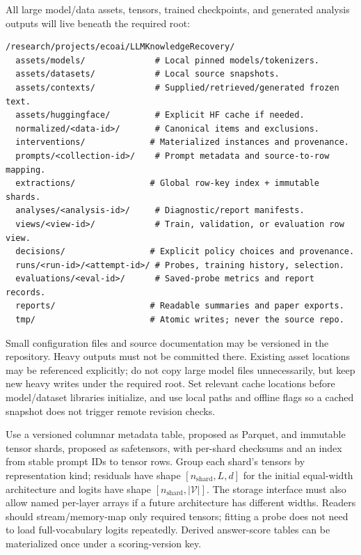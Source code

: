 \documentclass[11pt]{article}
\begin{document}
All large model/data assets, tensors, trained checkpoints, and generated analysis outputs will live beneath the required root:
\begin{verbatim}
/research/projects/ecoai/LLMKnowledgeRecovery/
  assets/models/              # Local pinned models/tokenizers.
  assets/datasets/            # Local source snapshots.
  assets/contexts/            # Supplied/retrieved/generated frozen text.
  assets/huggingface/         # Explicit HF cache if needed.
  normalized/<data-id>/       # Canonical items and exclusions.
  interventions/             # Materialized instances and provenance.
  prompts/<collection-id>/    # Prompt metadata and source-to-row mapping.
  extractions/               # Global row-key index + immutable shards.
  analyses/<analysis-id>/     # Diagnostic/report manifests.
  views/<view-id>/            # Train, validation, or evaluation row view.
  decisions/                 # Explicit policy choices and provenance.
  runs/<run-id>/<attempt-id>/ # Probes, training history, selection.
  evaluations/<eval-id>/      # Saved-probe metrics and report records.
  reports/                   # Readable summaries and paper exports.
  tmp/                       # Atomic writes; never the source repo.
\end{verbatim}
Small configuration files and source documentation may be versioned in the repository.
Heavy outputs must not be committed there.
Existing asset locations may be referenced explicitly; do not copy large model files unnecessarily, but keep new heavy writes under the required root.
Set relevant cache locations before model/dataset libraries initialize, and use local paths and offline flags so a cached snapshot does not trigger remote revision checks.

Use a versioned columnar metadata table, proposed as Parquet, and immutable tensor shards, proposed as safetensors, with per-shard checksums and an index from stable prompt IDs to tensor rows.
Group each shard's tensors by representation kind; residuals have shape $[n_{\mathrm{shard}},L,d]$ for the initial equal-width architecture and logits have shape $[n_{\mathrm{shard}},|\mathcal V|]$.
The storage interface must also allow named per-layer arrays if a future architecture has different widths.
Readers should stream/memory-map only required tensors; fitting a probe does not need to load full-vocabulary logits repeatedly.
Derived answer-score tables can be materialized once under a scoring-version key.
\end{document}
